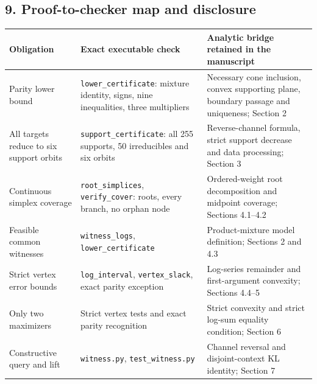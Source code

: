 \subsection{9. Proof-to-checker map and
disclosure}\label{proof-to-checker-map-and-disclosure}

{
\begin{longtable}[]{@{}
  >{\raggedright\arraybackslash}p{}
  >{\raggedright\arraybackslash}p{}
  >{\raggedright\arraybackslash}p{}@{}}
\toprule\noalign{}
\begin{minipage}[b]{\linewidth}\raggedright
Obligation
\end{minipage} & \begin{minipage}[b]{\linewidth}\raggedright
Exact executable check
\end{minipage} & \begin{minipage}[b]{\linewidth}\raggedright
Analytic bridge retained in the manuscript
\end{minipage} \\
\midrule\noalign{}
\endhead
\bottomrule\noalign{}
\endlastfoot
Parity lower bound & \texttt{lower\_certificate}: mixture identity,
signs, nine inequalities, three multipliers & Necessary cone inclusion,
convex supporting plane, boundary passage and uniqueness; Section 2 \\
All targets reduce to six support orbits &
\texttt{support\_certificate}: all 255 supports, 50 irreducibles and six
orbits & Reverse-channel formula, strict support decrease and data
processing; Section 3 \\
Continuous simplex coverage & \texttt{root\_simplices},
\texttt{verify\_cover}: roots, every branch, no orphan node &
Ordered-weight root decomposition and midpoint coverage; Sections
4.1--4.2 \\
Feasible common witnesses & \texttt{witness\_logs},
\texttt{lower\_certificate} & Product-mixture model definition; Sections
2 and 4.3 \\
Strict vertex error bounds & \texttt{log\_interval},
\texttt{vertex\_slack}, exact parity exception & Log-series remainder
and first-argument convexity; Sections 4.4--5 \\
Only two maximizers & Strict vertex tests and exact parity recognition &
Strict convexity and strict log-sum equality condition; Section 6 \\
Constructive query and lift & \texttt{witness.py},
\texttt{test\_witness.py} & Channel reversal and disjoint-context KL
identity; Section 7 \\
\end{longtable}
}

